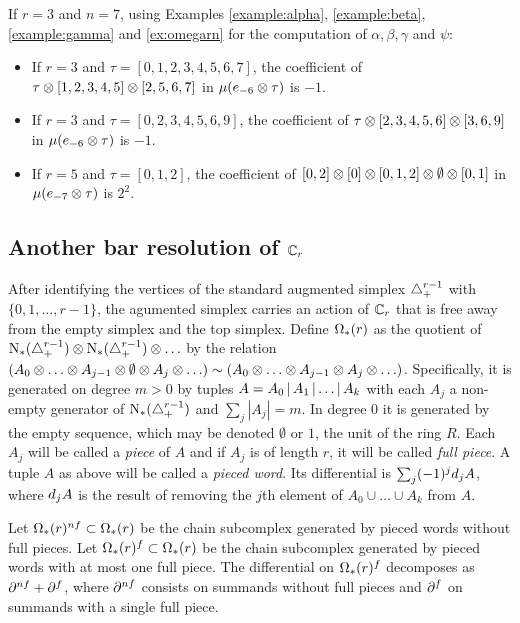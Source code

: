 \begin{example}\label{ex:omegarnfinal} If $r=3$ and $n=7$, using Examples \ref{example:alpha}, \ref{example:beta},  \ref{example:gamma} and \ref{ex:omegarn} for the computation of $\alpha,\beta,\gamma$ and $\psi$:
	\begin{itemize}
		\item If $r = 3$ and $\tau = [0,1,2,3,4,5,6,7]$, the coefficient of $\tau \otimes  [1,2,3,4,5] \otimes  [2,5,6,7]$ in $\mu(e_{-6} \otimes  \tau)$ is $-1$.
		\item If $r = 3$ and $\tau = [0,2,3,4,5,6,9]$, the coefficient of $\tau \otimes  [2,3,4,5,6] \otimes  [3,6,9]$ in $\mu(e_{-6} \otimes  \tau)$ is $-1$.
		\item If $r = 5$ and $\tau = [0,1,2]$, the coefficient of $[0,2] \otimes  [0] \otimes  [0,1,2] \otimes  \emptyset \otimes  [0,1]$ in $\mu(e_{-7} \otimes  \tau)$ is $2^2$.
	\end{itemize}
\end{example}

\subsection{Another bar resolution of \texorpdfstring{$\mathbb{C}_r$}{the cyclic group}}

After identifying the vertices of the standard augmented simplex $\triangle_{+}^{r-1}$ with $\{0,1,\ldots,r-1\}$, the agumented simplex carries an action of $\mathbb{C}_r$ that is free away from the empty simplex and the top simplex. Define $\operatorname{\Omega}_{*}(r)$ as the quotient of $\operatorname{N}_{*}(\triangle_{+}^{r-1}) \otimes  \operatorname{N}_{*}(\triangle_{+}^{r-1}) \otimes \ldots$ by the relation $(A_0 \otimes  \ldots  \otimes  A_{j-1} \otimes  \emptyset  \otimes  A_j \otimes  \ldots) \sim (A_0 \otimes  \ldots  \otimes  A_{j-1} \otimes  A_j  \otimes  \ldots)$. Specifically, it is generated on degree $m>0$ by tuples $A = A_0\operatorname{|} A_1\operatorname{|}\ldots \operatorname{|} A_k$ with each $A_j$ a non-empty generator of $\operatorname{N}_{*}(\triangle_{+}^{r-1})$ and $\sum_j |A_j| = m$. In degree $0$ it is generated by the empty sequence, which may be denoted $\emptyset$ or $1$, the unit of the ring $R$. Each $A_j$ will be called a \emph{piece} of $A$ and if $A_j$ is of length $r$, it will be called \emph{full piece}. A tuple $A$ as above will be called a \emph{pieced word}. Its differential is $\sum_{j} (-1)^j d_j A$, where $d_jA$ is the result of removing the $j$th element of $A_0\cup \ldots\cup A_k$ from $A$.

Let $\operatorname{\Omega}_{*}(r)^{nf}\subset \operatorname{\Omega}_{*}(r)$ be the chain subcomplex generated by pieced words without full pieces. Let $\operatorname{\Omega}_{*}(r)^{f}\subset \operatorname{\Omega}_{*}(r)$ be the chain subcomplex generated by pieced words with at most one full piece. The differential on $\operatorname{\Omega}_{*}(r)^{f}$ decomposes as $\partial^{nf}+\partial^{f}$, where $\partial^{nf}$ consists on summands without full pieces and $\partial^{f}$ on summands with a single full piece.


